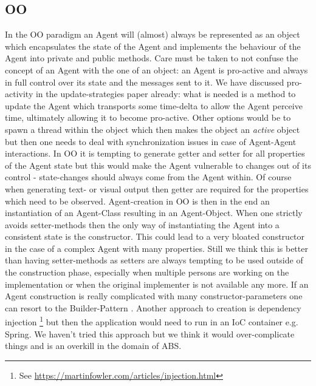 \subsection{OO}
In the OO paradigm an Agent will (almost) always be represented as an object which encapsulates the state of the Agent and implements the behaviour of the Agent into private and public methods. Care must be taken to not confuse the concept of an Agent with the one of an object: an Agent is pro-active and always in full control over its state and the messages sent to it. We have discussed pro-activity in the update-strategies paper already: what is needed is a method to update the Agent which transports some time-delta to allow the Agent perceive time, ultimately allowing it to become pro-active. Other options would be to spawn a thread within the object which then makes the object an \textit{active} object but then one needs to deal with synchronization issues in case of Agent-Agent interactions. 
In OO it is tempting to generate getter and setter for all properties of the Agent state but this would make the Agent vulnerable to changes out of its control - state-changes should always come from the Agent within. Of course when generating text- or visual output then getter are required for the properties which need to be observed.
Agent-creation in OO is then in the end an instantiation of an Agent-Class resulting in an Agent-Object. When one strictly avoids setter-methods then the only way of instantiating the Agent into a consistent state is the constructor. This could lead to a very bloated constructor in the case of a complex Agent with many properties. Still we think this is better than having setter-methods as setters are always tempting to be used outside of the construction phase, especially when multiple persons are working on the implementation or when the original implementer is not available any more. If an Agent construction is really complicated with many constructor-parameters one can resort to the Builder-Pattern \cite{bloch_effective_2014}. Another approach to creation is dependency injection \footnote{See \url{https://martinfowler.com/articles/injection.html}} but then the application would need to run in an IoC container e.g. Spring. We haven't tried this approach but we think it would over-complicate things and is an overkill in the domain of ABS.


